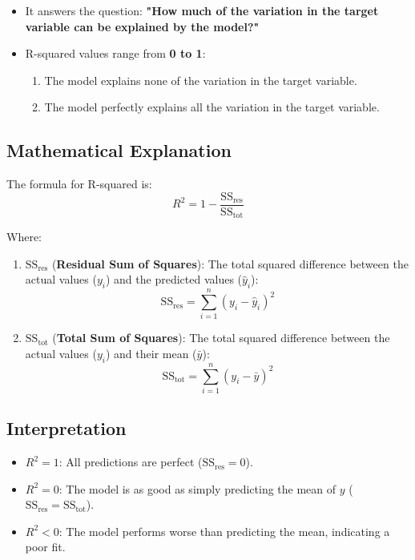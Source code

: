 \documentclass[12pt]{book}
\begin{document}
\begin{itemize}
    \item [-] It answers the question: \textbf{"How much of the variation in the target variable can be explained by the model?"}
    \item [-] R-squared values range from \textbf{0 to 1}:
    \begin{enumerate}
        \item The model explains none of the variation in the target variable.
        \item The model perfectly explains all the variation in the target variable.
    \end{enumerate}
      
\end{itemize}


\subsection*{ \textbf{Mathematical Explanation}}

The formula for R-squared is:
\[
R^2 = 1 - \frac{\text{SS}_{\text{res}}}{\text{SS}_{\text{tot}}}
\]

Where:

\begin{enumerate}
    \item \(\text{SS}_{\text{res}}\) (\textbf{Residual Sum of Squares}): The total squared difference between the actual values (\(y_i\)) and the predicted values (\(\hat{y}_i\)):
            \[
            \text{SS}_{\text{res}} = \sum_{i=1}^n (y_i - \hat{y}_i)^2
            \]
   \item \(\text{SS}_{\text{tot}}\) (\textbf{Total Sum of Squares}): The total squared difference between the actual values (\(y_i\)) and their mean (\(\bar{y}\)):
        \[
        \text{SS}_{\text{tot}} = \sum_{i=1}^n (y_i - \bar{y})^2
        \]
\end{enumerate}

\subsection*{ \textbf{Interpretation}}

\begin{itemize}
    \item [-] \(R^2 = 1\): All predictions are perfect (\(\text{SS}_{\text{res}} = 0\)).
    \item [-] \(R^2 = 0\): The model is as good as simply predicting the mean of \(y\) (\(\text{SS}_{\text{res}} = \text{SS}_{\text{tot}}\)).
    \item [-] \(R^2 < 0\): The model performs worse than predicting the mean, indicating a poor fit.
\end{itemize}
\end{document}
